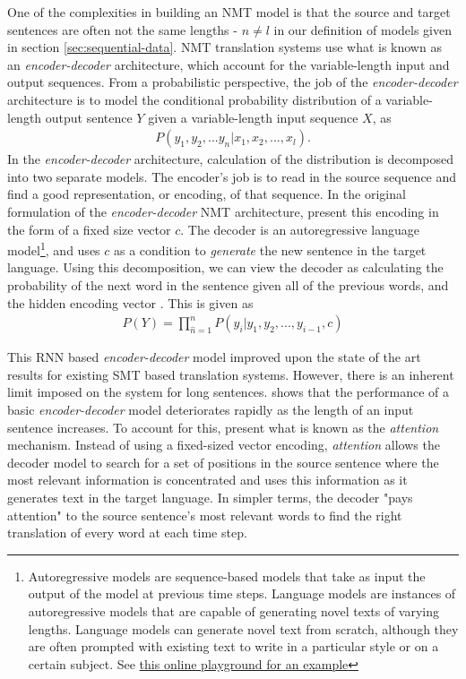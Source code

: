 \newcommand{\ed}{\emph{encoder-decoder}}
One of the complexities in building an NMT model is that the source and target sentences are often not the same lengths - $n \neq l$ in our definition of \seq{} models given in section \ref{sec:sequential-data}. NMT translation systems use what is known as an \ed{} architecture, which account for the variable-length input and output sequences. From a probabilistic perspective, the job of the \ed{} architecture is to model the conditional probability distribution of a variable-length output sentence $Y$ given a variable-length input sequence $X$, as
\begin{align*}
P(y_1, y_2, ... y_n | x_1, x_2, ..., x_l). 
\end{align*}
In the \ed{} architecture, calculation of the distribution is decomposed into two separate models. The encoder's job is to read in the source sequence and find a good representation, or encoding, of that sequence. In the original formulation of the \ed{} NMT architecture, \citet{cho2014learning} present this encoding in the form of a fixed size vector $c$. The decoder is an autoregressive language model\footnote{Autoregressive models are sequence-based models that take as input the output of the model at previous time steps. Language models are instances of autoregressive models that are capable of generating novel texts of varying lengths. Language models can generate novel text from scratch, although they are often prompted with existing text to write in a particular style or on a certain subject. See \href{https://transformer.huggingface.co/doc/distil-gpt2}{this online playground for an example}}, and uses $c$ as a condition to \emph{generate} the new sentence in the target language. Using this decomposition, we can view the decoder as calculating the probability of the next word in the sentence given all of the previous words, and the hidden encoding vector \cite{bahdanau2014neural}. This is given as
\begin{align*}
P(Y) = \prod_{\hat{n}=1}^{n}P(y_i \vert y_1, y_2, ..., y_{i-1}, c)    
\end{align*}


\newcommand{\at}[1]{\emph{#1}}

This RNN based \ed{} model improved upon the state of the art results for existing SMT based translation systems. However, there is an inherent limit imposed on the system for long sentences. \citet{cho2014learning} shows that the performance of a basic \ed{} model deteriorates rapidly as the length of an input sentence increases. To account for this, 
\citet{bahdanau2014neural} present what is known as the \at{attention} mechanism. Instead of using a fixed-sized vector encoding, \at{attention} allows the decoder model to search for a set of positions in the source sentence where the most relevant information is concentrated and uses this information as it generates text in the target language. In simpler terms, the decoder "pays attention" to the source sentence's most relevant words to find the right translation of every word at each time step. 


